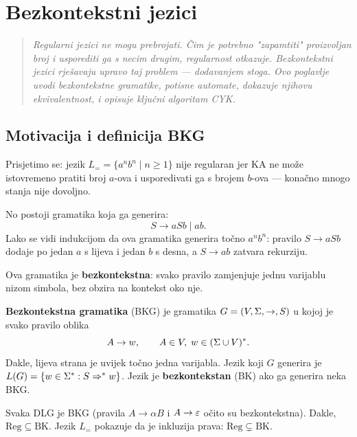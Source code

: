 \chapter{Bezkontekstni jezici}
\label{chap:5}

\begin{quote}
\itshape
Regularni jezici ne mogu prebrojati. Čim je potrebno "zapamtiti"
proizvoljan broj i usporediti ga s necim drugim, regularnost otkazuje.
Bezkontekstni jezici rješavaju upravo taj problem --- dodavanjem stoga.
Ovo poglavlje uvodi bezkontekstne gramatike, potisne automate,
dokazuje njihovu ekvivalentnost, i opisuje ključni algoritam CYK.
\end{quote}


\section{Motivacija i definicija BKG}

Prisjetimo se: jezik $L_= = \{a^n b^n \mid n \geq 1\}$ nije regularan
jer KA ne može istovremeno pratiti broj $a$-ova i usporedivati ga s
brojem $b$-ova --- konačno mnogo stanja nije dovoljno.

No postoji gramatika koja ga generira:
\[
  S \to aSb \mid ab.
\]
Lako se vidi indukcijom da ova gramatika generira točno $a^n b^n$:
pravilo $S \to aSb$ dodaje po jedan $a$ s lijeva i jedan $b$ s desna,
a $S \to ab$ zatvara rekurziju.

Ova gramatika je \textbf{bezkontekstna}: svako pravilo zamjenjuje
jednu varijablu nizom simbola, bez obzira na kontekst oko nje.

\begin{definicija}
\textbf{Bezkontekstna gramatika} (BKG) je gramatika $G = (V, \Sigma, \to, S)$
u kojoj je svako pravilo oblika
\[
  A \to w, \qquad A \in V,\; w \in (\Sigma \cup V)^*.
\]
Dakle, lijeva strana je uvijek točno jedna varijabla. Jezik koji
$G$ generira je $L(G) = \{w \in \Sigma^* : S \Rightarrow^* w\}$.
Jezik je \textbf{bezkontekstan} (BK) ako ga generira neka BKG.
\end{definicija}

\begin{napomena}
Svaka DLG je BKG (pravila $A \to \alpha B$ i $A \to \varepsilon$ očito
su bezkontekstna). Dakle, $\mathrm{Reg} \subseteq \mathrm{BK}$.
Jezik $L_=$ pokazuje da je inkluzija prava: $\mathrm{Reg} \subsetneq \mathrm{BK}$.
\end{napomena}

